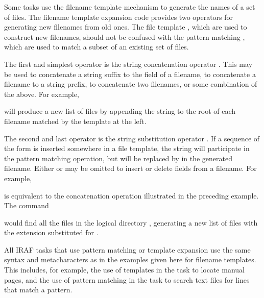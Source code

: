Some tasks use the filename template mechanism to generate the names of a
 set of  files.  The filename template
expansion code provides two operators for generating new filenames from
old ones.  The file template , which are used to
construct new filenames, should not be confused with the pattern matching
, which are used to match a subset of an existing
set of files.

The first and simplest operator is the string concatenation operator
\comptype{//}.  This may be used to concatenate a string suffix to the
 field of a filename, to concatenate a filename to a string
prefix, to concatenate two filenames, or some combination of the above.
For example,

\begin{quotation}\noindent
{} 
\end{quotation}

\noindent
will produce a new list of files by appending the string  to
the root of each filename matched by the template at the left.

The second and last operator is the string substitution operator
\comptype{\%}.  If a sequence of the form  is inserted
somewhere in a file template, the string  will participate in
the pattern matching operation, but will be replaced by  in the
generated filename.  Either  or  may be omitted to
insert or delete fields from a filename.  For example,

\begin{quotation}\noindent
{} 
\end{quotation}

\noindent
is equivalent to the concatenation operation illustrated in the preceding
example.  The command

\begin{quotation}\noindent
{} 
\end{quotation}

\noindent
would find all the  files in the logical directory
, generating a new list of files with the extension
 substituted for .

All IRAF tasks that use pattern matching or template expansion use the same
syntax and metacharacters as in the examples given here for filename templates.
This includes, for example, the use of templates in the  task
to locate manual pages, and the use of pattern matching in the 
task to search text files for lines that match a pattern.


